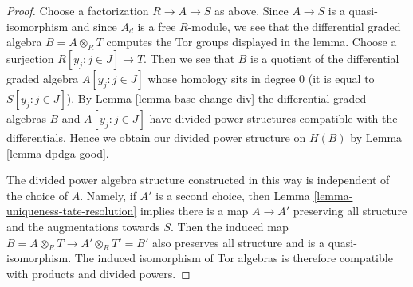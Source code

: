 \documentclass{stacks-project}
\theoremstyle{plain}
\theoremstyle{definition}
\theoremstyle{remark}
\numberwithin{equation}{subsection}
\begin{document}
\begin{proof}
Choose a factorization $R \to A \to S$ as above. Since $A \to S$
is a quasi-isomorphism and since $A_d$ is a free $R$-module,
we see that the differential graded algebra $B = A \otimes_R T$ computes
the Tor groups displayed in the lemma. Choose a surjection
$R[y_j:j\in J] \to T$. Then we see that
$B$ is a quotient of the differential graded algebra
$A[y_j:j\in J]$ whose homology sits in degree $0$ (it is equal
to $S[y_j:j\in J]$).
By Lemma \ref{lemma-base-change-div} the differential graded algebras $B$ and
$A[y_j:j\in J]$ have divided power structures compatible
with the differentials. Hence we obtain our divided
power structure on $H(B)$ by Lemma \ref{lemma-dpdga-good}.

\medskip\noindent
The divided power algebra structure constructed in this way is independent
of the choice of $A$. Namely, if $A'$ is a second choice, then
Lemma \ref{lemma-uniqueness-tate-resolution}
implies there is a map $A \to A'$ preserving all structure and the
augmentations towards $S$. Then the induced map
$B = A \otimes_R T \to A' \otimes_R T' = B'$ also preserves
all structure
and is a quasi-isomorphism. The induced isomorphism of
Tor algebras is therefore compatible with products
and divided powers.
\end{proof}
\end{document}

